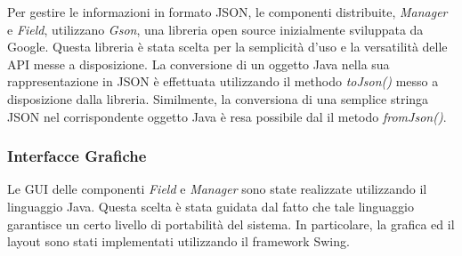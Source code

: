 Per gestire le informazioni in formato JSON, le componenti distribuite, \emph{Manager} e \emph{Field}, utilizzano \emph{Gson}, una libreria open source  inizialmente sviluppata da Google. Questa libreria è stata scelta per la semplicità d'uso e la versatilità delle API messe a disposizione. La conversione di un oggetto Java nella sua rappresentazione in JSON è effettuata utilizzando il methodo \emph{toJson()} messo a disposizione dalla libreria. Similmente, la conversiona di una semplice stringa JSON nel corrispondente oggetto Java è resa possibile dal il metodo \emph{fromJson()}.

\subsubsection{Interfacce Grafiche}
Le GUI delle componenti \emph{Field} e \emph{Manager} sono state realizzate utilizzando il linguaggio Java. Questa scelta \`{e} stata guidata dal fatto che tale linguaggio garantisce un certo livello di portabilit\`{a} del sistema. In particolare, la grafica ed il layout sono stati implementati utilizzando il framework Swing.
